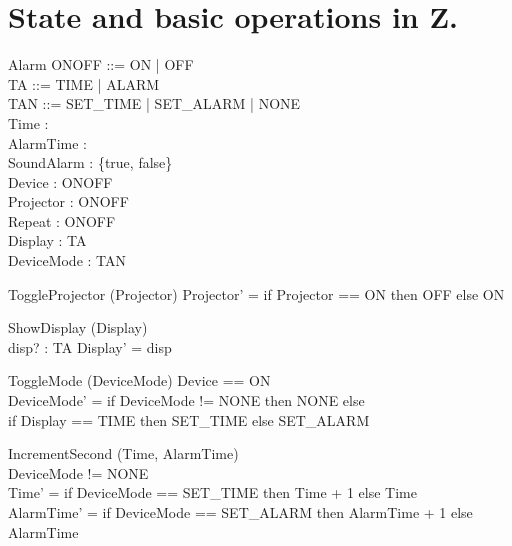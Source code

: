 \documentclass[Main_Assignment2]{subfiles}
\begin{document}
\section{State and basic operations in Z.}



\begin{schema}{Alarm}
ONOFF ::= ON | OFF  \\
TA ::= TIME | ALARM \\
TAN ::= SET\_TIME | SET\_ALARM | NONE \\
Time :  \\
AlarmTime :  \\
SoundAlarm : \{true, false\}\\
Device : ONOFF\\
Projector : ONOFF \\
Repeat : ONOFF \\
Display : TA\\
DeviceMode : TAN
\end{schema}


\begin{schema}{ToggleProjector} %
\Delta (Projector) 
\where
Projector' = if\; Projector == ON\; then\; OFF\; else\; ON 
\end{schema}


\begin{schema}{ShowDisplay} %
\Delta (Display)\\
disp? : TA
\where
Display' = disp
\end{schema}


\begin{schema}{ToggleMode} %
\Delta (DeviceMode) 
\where
Device == ON\\
DeviceMode' = if\; DeviceMode\; != NONE \; then\; NONE\; else\; \\
\hspace{20pt} if\; Display == TIME\; then\; SET\_TIME\; else\; SET\_ALARM
\end{schema}

\begin{schema}{IncrementSecond}
\Delta (Time, AlarmTime) \\
\where
DeviceMode\; != NONE\\
Time' = if\; DeviceMode == SET\_TIME\; then\; Time + 1\; else\; Time\\
AlarmTime' = if\; DeviceMode == SET\_ALARM\; then\; AlarmTime + 1\; else\; AlarmTime\\
\end{schema}
\end{document}
